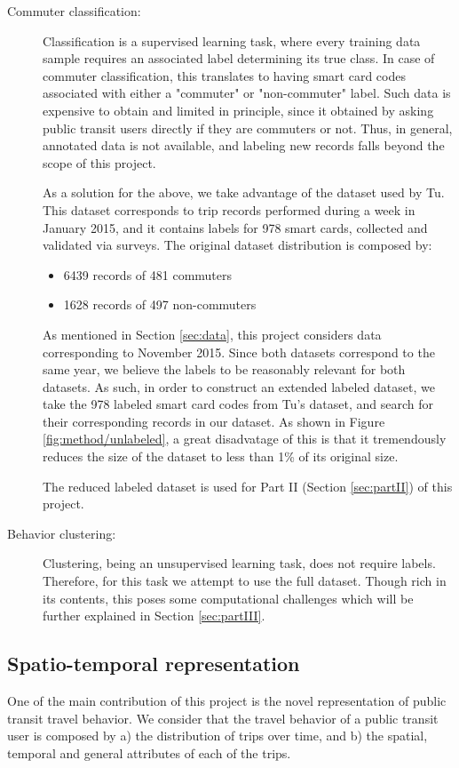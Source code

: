 \documentclass{article}
\begin{document}
\begin{description}%
\item[Commuter classification:]
Classification is a supervised learning task, where every training data sample requires an associated label determining its true class. In case of commuter classification, this translates to having smart card codes associated with either a "commuter" or "non-commuter" label. Such data is expensive to obtain and limited in principle, since it obtained by asking public transit users directly if they are commuters or not. Thus, in general, annotated data is not available, and labeling new records falls beyond the scope of this project. 

As a solution for the above, we take advantage of the dataset used by Tu\cite{tu2016impact}. This dataset corresponds to trip records performed during a week in January 2015, and it contains labels for 978 smart cards, collected and validated via surveys. The original dataset distribution is composed by:

\begin{itemize}
\item 6439 records of 481 commuters
\item 1628 records of 497 non-commuters
\end{itemize}

As mentioned in Section \ref{sec:data}, this project considers data corresponding to November 2015. Since both datasets correspond to the same year, we believe the labels to be reasonably relevant for both datasets. As such, in order to construct an extended labeled dataset, we take the 978 labeled smart card codes from Tu's dataset, and search for their corresponding records in our dataset. As shown in Figure \ref{fig:method/unlabeled}, a great disadvatage of this is that it tremendously reduces the size of the dataset to less than 1\% of its original size. 

The reduced labeled dataset is used for Part II (Section \ref{sec:partII}) of this project. 

\item[Behavior clustering:] 
Clustering, being an unsupervised learning task, does not require labels. Therefore, for this task we attempt to use the full dataset. Though rich in its contents, this poses some computational challenges which will be further explained in Section \ref{sec:partIII}. 
\end{description}

\subsection{Spatio-temporal representation}
\label{sec:structure}
One of the main contribution of this project is the novel representation of public transit travel behavior. We consider that the travel behavior of a public transit user is composed by a) the distribution of trips over time, and b) the spatial, temporal and general attributes of each of the trips. 
\end{document}
